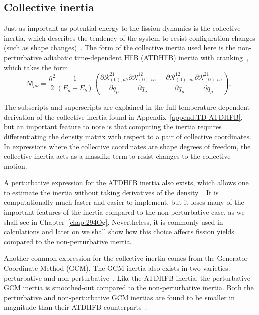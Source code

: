 \subsection{Collective inertia}
Just as important as potential energy to the fission dynamics is the collective inertia, which describes the tendency of the system to resist configuration changes (such as shape changes)~\cite{Hill1953}. The form of the collective inertia used here is the non-perturbative adiabatic time-dependent HFB (ATDHFB) inertia with cranking~\cite{Baran2011}, which takes the form
\begin{equation}\label{eq:mATDHFB-np}
\mathsf{M}_{\mu\nu} =  \frac{\hbar^2}{2}\frac{1}{(E_a+E_b)}\left(\frac{\partial\mathcal{R}^{21}_{(0),ab}}{\partial q_\mu}\frac{\partial\mathcal{R}^{12}_{(0),ba}}{\partial q_\nu}+\frac{\partial\mathcal{R}^{12}_{(0),ab}}{\partial q_\mu}\frac{\partial\mathcal{R}^{21}_{(0),ba}}{\partial q_\mu}\right),
\end{equation}

\noindent The subscripts and superscripts are explained in the full temperature-dependent derivation of the collective inertia found in Appendix~\ref{append:TD-ATDHFB}, but an important feature to note is that computing the inertia requires differentiating the density matrix with respect to a pair of collective coordinates. In expressions where the collective coordinates are shape degrees of freedom, the collective inertia acts as a masslike term to resist changes to the collective motion.

A perturbative expression for the ATDHFB inertia also exists, which allows one to estimate the inertia without taking derivatives of the density~\cite{Baran2011}. It is computationally much faster and easier to implement, but it loses many of the important features of the inertia compared to the non-perturbative case, as we shall see in Chapter~\ref{chap:294Og}. Nevertheless, it is commonly-used in calculations and later on we shall show how this choice affects fission yields compared to the non-perturbative inertia.

Another common expression for the collective inertia comes from the Generator Coordinate Method (GCM). The GCM inertia also exists in two varieties: perturbative and non-perturbative~\cite{giuliani2018b}. Like the ATDHFB inertia, the perturbative GCM inertia is smoothed-out compared to the non-perturbative inertia. Both the perturbative and non-perturbative GCM inertias are found to be smaller in magnitude than their ATDHFB counterparts~\cite{Fiolhais1983,giuliani2018b}.


